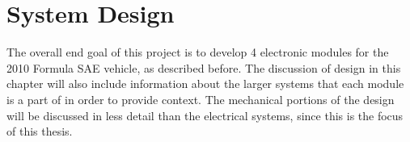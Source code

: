 \chapter{System Design\label{cha:design}}

The overall end goal of this project is to develop 4 electronic modules for the 2010 Formula SAE vehicle, as described before. The discussion of design in this chapter will also include information about the larger systems that each module is a part of in order to provide context. The mechanical portions of the design will be discussed in less detail than the electrical systems, since this is the focus of this thesis.











